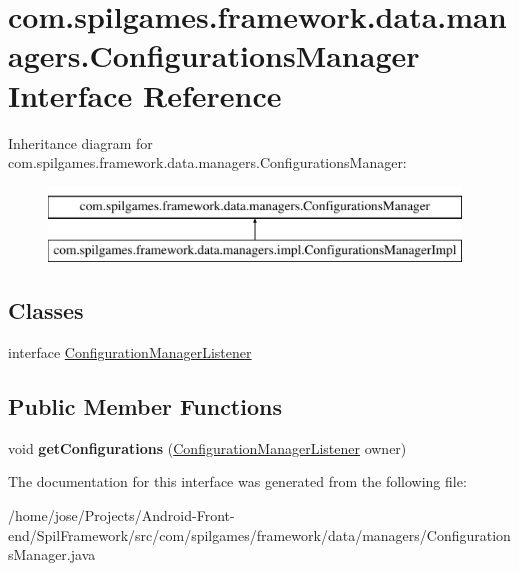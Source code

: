 \hypertarget{interfacecom_1_1spilgames_1_1framework_1_1data_1_1managers_1_1_configurations_manager}{\section{com.\-spilgames.\-framework.\-data.\-managers.\-Configurations\-Manager Interface Reference}
\label{interfacecom_1_1spilgames_1_1framework_1_1data_1_1managers_1_1_configurations_manager}
}
Inheritance diagram for com.\-spilgames.\-framework.\-data.\-managers.\-Configurations\-Manager\-:\begin{figure}[H]
\begin{center}
\leavevmode
\includegraphics[height=2.000000cm]{interfacecom_1_1spilgames_1_1framework_1_1data_1_1managers_1_1_configurations_manager}
\end{center}
\end{figure}
\subsection*{Classes}
\begin{DoxyCompactItemize}
\item 
interface \hyperlink{interfacecom_1_1spilgames_1_1framework_1_1data_1_1managers_1_1_configurations_manager_1_1_configuration_manager_listener}{Configuration\-Manager\-Listener}
\end{DoxyCompactItemize}
\subsection*{Public Member Functions}
\begin{DoxyCompactItemize}
\item 
\hypertarget{interfacecom_1_1spilgames_1_1framework_1_1data_1_1managers_1_1_configurations_manager_a5e88cc8297fd705995e18be3f0afeadf}{void {\bfseries get\-Configurations} (\hyperlink{interfacecom_1_1spilgames_1_1framework_1_1data_1_1managers_1_1_configurations_manager_1_1_configuration_manager_listener}{Configuration\-Manager\-Listener} owner)}\label{interfacecom_1_1spilgames_1_1framework_1_1data_1_1managers_1_1_configurations_manager_a5e88cc8297fd705995e18be3f0afeadf}

\end{DoxyCompactItemize}


The documentation for this interface was generated from the following file\-:\begin{DoxyCompactItemize}
\item 
/home/jose/\-Projects/\-Android-\/\-Front-\/end/\-Spil\-Framework/src/com/spilgames/framework/data/managers/Configurations\-Manager.\-java\end{DoxyCompactItemize}
